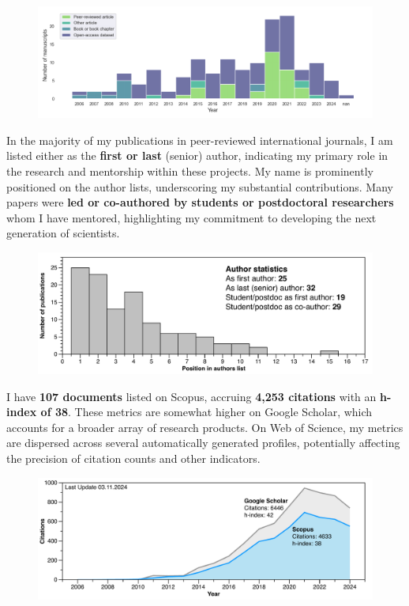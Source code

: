 \documentclass[11pt]{article}
\begin{document}
\begin{figure}[h]
\centering
\includegraphics[width=\textwidth]{img/products_per_year.png}
\end{figure}

{\normalfont In the majority of my publications in peer-reviewed international journals, I am listed either as the \textbf{first or last} (senior) author, indicating my primary role in the research and mentorship within these projects. My name is prominently positioned on the author lists, underscoring my substantial contributions. Many papers were \textbf{led or co-authored by students or postdoctoral researchers} whom I have mentored, highlighting my commitment to developing the next generation of scientists.}

\begin{figure}[h]
\centering
\includegraphics[width=\textwidth]{img/Manuscripts.pdf}
\end{figure}

{\normalfont I have \textbf{107 documents} listed on Scopus, accruing \textbf{4,253 citations} with an \textbf{h-index of 38}. These metrics are somewhat higher on Google Scholar, which accounts for a broader array of research products. On Web of Science, my metrics are dispersed across several automatically generated profiles, potentially affecting the precision of citation counts and other indicators.}

\begin{figure}[h]
\centering
\includegraphics[width=\textwidth]{img/CITATIONS.pdf}
\end{figure}
\end{document}
